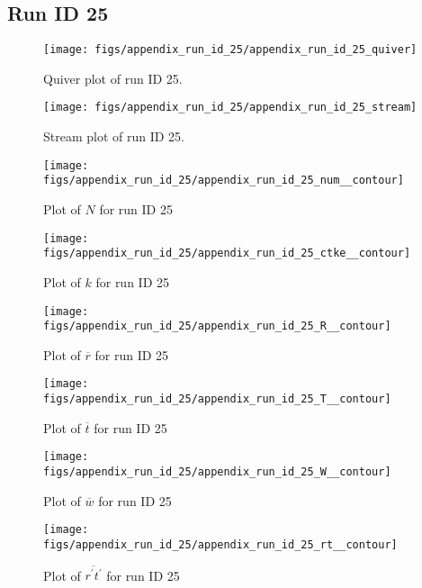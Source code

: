 \subsection{Run ID 25}
\begin{figure}[H]
\centering
\texttt{[image: figs/appendix\_run\_id\_25/appendix\_run\_id\_25\_quiver]}
\caption{Quiver plot of run ID 25.}
\label{fig:appendix_run_id_25_quiver}
\end{figure}


\begin{figure}[H]
\centering
\texttt{[image: figs/appendix\_run\_id\_25/appendix\_run\_id\_25\_stream]}
\caption{Stream plot of run ID 25.}
\label{fig:appendix_run_id_25_stream}
\end{figure}


\begin{figure}[H]
\centering
\texttt{[image: figs/appendix\_run\_id\_25/appendix\_run\_id\_25\_num\_\_contour]}
\caption{Plot of $N$ for run ID 25}
\label{fig:appendix_run_id_25_num__contour}
\end{figure}


\begin{figure}[H]
\centering
\texttt{[image: figs/appendix\_run\_id\_25/appendix\_run\_id\_25\_ctke\_\_contour]}
\caption{Plot of $k$ for run ID 25}
\label{fig:appendix_run_id_25_ctke__contour}
\end{figure}


\begin{figure}[H]
\centering
\texttt{[image: figs/appendix\_run\_id\_25/appendix\_run\_id\_25\_R\_\_contour]}
\caption{Plot of $\overline{r}$ for run ID 25}
\label{fig:appendix_run_id_25_R__contour}
\end{figure}


\begin{figure}[H]
\centering
\texttt{[image: figs/appendix\_run\_id\_25/appendix\_run\_id\_25\_T\_\_contour]}
\caption{Plot of $\overline{t}$ for run ID 25}
\label{fig:appendix_run_id_25_T__contour}
\end{figure}


\begin{figure}[H]
\centering
\texttt{[image: figs/appendix\_run\_id\_25/appendix\_run\_id\_25\_W\_\_contour]}
\caption{Plot of $\overline{w}$ for run ID 25}
\label{fig:appendix_run_id_25_W__contour}
\end{figure}


\begin{figure}[H]
\centering
\texttt{[image: figs/appendix\_run\_id\_25/appendix\_run\_id\_25\_rt\_\_contour]}
\caption{Plot of $\overline{r^\prime t^\prime}$ for run ID 25}
\label{fig:appendix_run_id_25_rt__contour}
\end{figure}


